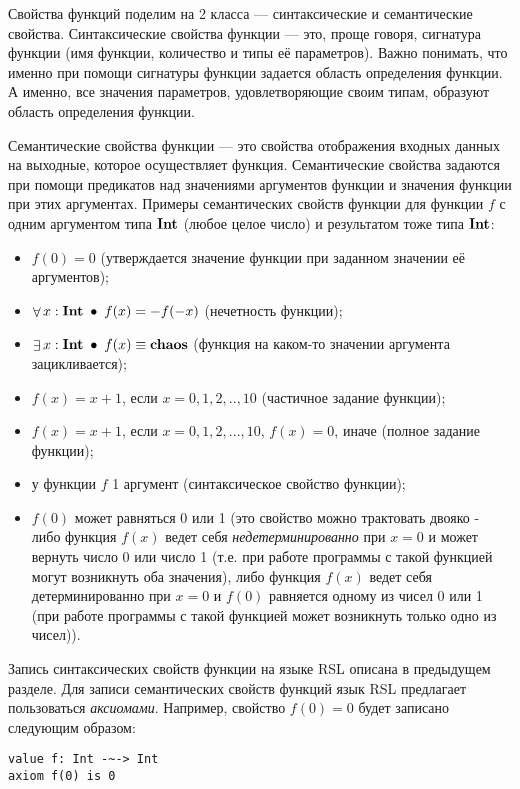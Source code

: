 Свойства функций поделим на 2 класса --- синтаксические и семантические свойства. Синтаксические свойства функции --- это, проще говоря, сигнатура функции (имя функции, количество и типы её параметров). Важно понимать, что именно при помощи сигнатуры функции задается область определения функции. А именно, все значения параметров, удовлетворяющие своим типам, образуют область определения функции.

Семантические свойства функции --- это свойства отображения входных данных на выходные, которое осуществляет функция. Семантические свойства задаются при помощи предикатов над значениями аргументов функции и значения функции при этих аргументах. Примеры семантических свойств функции для функции $f$ с одним аргументом типа $\textbf{Int}$ (любое целое число) и результатом тоже типа $\textbf{Int}$:

\begin{itemize}
  \item $f(0) = 0$ (утверждается значение функции при заданном значении её аргументов);
  \item $\mathop{\forall} x: \textbf{Int} ~\mathop{\bullet}~ f(x) = -f(-x)$ (нечетность функции);
  \item $\mathop{\exists} x: \textbf{Int} ~\mathop{\bullet}~ f(x) \equiv \textbf{chaos}$ (функция на каком-то значении аргумента зацикливается);
  \item $f(x) = x + 1$, если $x = 0, 1, 2, .., 10$ (частичное задание функции);
  \item $f(x) = x + 1$, если $x = 0, 1, 2, ..., 10$, $f(x) = 0$, иначе (полное задание функции);
  \item у функции $f$ 1 аргумент (синтаксическое свойство функции);
  \item $f(0)$ может равняться 0 или 1 (это свойство можно трактовать двояко - либо функция $f(x)$ ведет себя \emph{недетерминированно} при $x = 0$ и может вернуть число 0 или число 1 (т.е. при работе программы с такой функцией могут возникнуть оба значения), либо функция $f(x)$ ведет себя детерминированно при $x = 0$ и $f(0)$ равняется одному из чисел 0 или 1 (при работе программы с такой функцией может возникнуть только одно из чисел)).
\end{itemize}

Запись синтаксических свойств функции на языке RSL описана в предыдущем разделе. Для записи семантических свойств функций язык RSL предлагает пользоваться \emph{аксиомами}. Например, свойство $f(0) = 0$ будет записано следующим образом:

\begin{lstlisting}
value f: Int -~-> Int
axiom f(0) is 0
\end{lstlisting}

